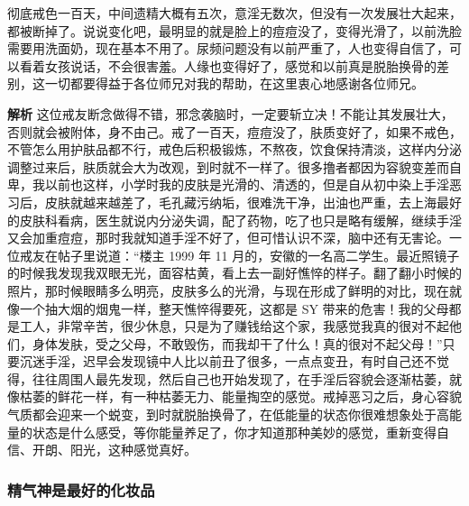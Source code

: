 \begin{case}
    彻底戒色一百天，中间遗精大概有五次，意淫无数次，但没有一次发展壮大起来，都被断掉了。说说变化吧，最明显的就是脸上的痘痘没了，变得光滑了，以前洗脸需要用洗面奶，现在基本不用了。尿频问题没有以前严重了，人也变得自信了，可以看着女孩说话，不会很害羞。人缘也变得好了，感觉和以前真是脱胎换骨的差别，这一切都要得益于各位师兄对我的帮助，在这里衷心地感谢各位师兄。

    \textbf{解析} 这位戒友断念做得不错，邪念袭脑时，一定要斩立决！不能让其发展壮大，否则就会被附体，身不由己。戒了一百天，痘痘没了，肤质变好了，如果不戒色，不管怎么用护肤品都不行，戒色后积极锻炼，不熬夜，饮食保持清淡，这样内分泌调整过来后，肤质就会大为改观，到时就不一样了。很多撸者都因为容貌变差而自卑，我以前也这样，小学时我的皮肤是光滑的、清透的，但是自从初中染上手淫恶习后，皮肤就越来越差了，毛孔藏污纳垢，很难洗干净，出油也严重，去上海最好的皮肤科看病，医生就说内分泌失调，配了药物，吃了也只是略有缓解，继续手淫又会加重痘痘，那时我就知道手淫不好了，但可惜认识不深，脑中还有无害论。一位戒友在帖子里说道：“楼主 1999 年 11 月的，安徽的一名高二学生。最近照镜子的时候我发现我双眼无光，面容枯黄，看上去一副好憔悴的样子。翻了翻小时候的照片，那时候眼睛多么明亮，皮肤多么的光滑，与现在形成了鲜明的对比，现在就像一个抽大烟的烟鬼一样，整天憔悴得要死，这都是 SY 带来的危害！我的父母都是工人，非常辛苦，很少休息，只是为了赚钱给这个家，我感觉我真的很对不起他们，身体发肤，受之父母，不敢毁伤，而我却干了什么！真的很对不起父母！”只要沉迷手淫，迟早会发现镜中人比以前丑了很多，一点点变丑，有时自己还不觉得，往往周围人最先发现，然后自己也开始发现了，在手淫后容貌会逐渐枯萎，就像枯萎的鲜花一样，有一种枯萎无力、能量掏空的感觉。戒掉恶习之后，身心容貌气质都会迎来一个蜕变，到时就脱胎换骨了，在低能量的状态你很难想象处于高能量的状态是什么感受，等你能量养足了，你才知道那种美妙的感觉，重新变得自信、开朗、阳光，这种感觉真好。
\end{case}

\subsubsection{精气神是最好的化妆品}

